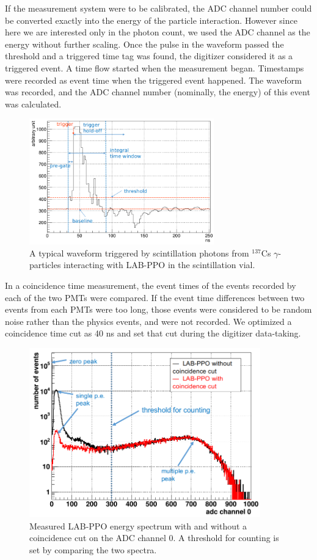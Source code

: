 If the measurement system were to be calibrated, the ADC channel number could be converted exactly into the energy of the particle interaction. However since here we are interested only in the photon count, we used the ADC channel as the energy without further scaling. Once the pulse in the waveform passed the threshold and a triggered time tag was found, the digitizer considered it as a triggered event. A time flow started when the measurement began. Timestamps were recorded as event time when the triggered event happened. The waveform was recorded, and the ADC channel number (nominally, the energy) of this event was calculated.

\begin{figure}[htbp]
	\centering	
	\includegraphics[width=8cm]{teLS_waveform.png}
	\caption[A typical triggered waveform.]{A typical waveform triggered by scintillation photons from $^{137}$Cs $\gamma$-particles interacting with LAB-PPO in the scintillation vial.}
	\label{teLSwaveform}
\end{figure}

In a coincidence time measurement, the event times of the events recorded by each of the two PMTs were compared. If the event time differences between two events from each PMTs were too long, those events were considered to be random noise rather than the physics events, and were not recorded. We optimized a coincidence time cut as 40 ns and set that cut during the digitizer data-taking. 

\begin{figure}[htbp]
	\centering	
	\includegraphics[width=10cm]{TeLScoinCut.png}
	\caption[Measured LAB-PPO energy spectrum with and without coincidence cut.]{Measured LAB-PPO energy spectrum with and without a coincidence cut on the ADC channel 0. A threshold for counting is set by comparing the two spectra.}
	\label{teLScoinCut}
\end{figure}

